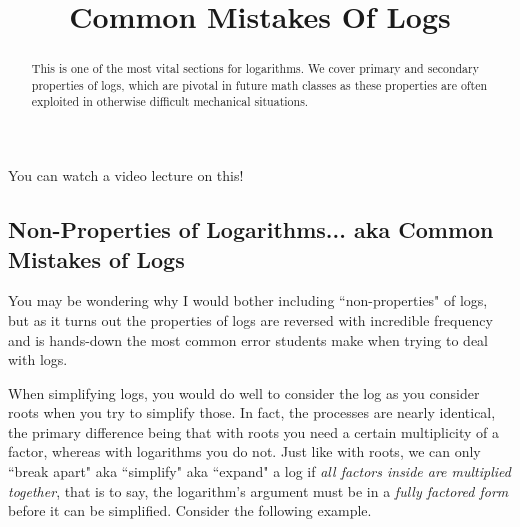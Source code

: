 \documentclass{ximera}
\title{Common Mistakes Of Logs}
\begin{document}
\begin{abstract}
This is one of the most vital sections for logarithms. We cover primary and secondary properties of logs, which are pivotal in future math classes as these properties are often exploited in otherwise difficult mechanical situations.
\end{abstract}
\maketitle

You can watch a video lecture on this!


\subsection*{Non-Properties of Logarithms... aka Common Mistakes of Logs}
    
    You may be wondering why I would bother including ``non-properties" of logs, but as it turns out the properties of logs are reversed with incredible frequency and is hands-down the most common error students make when trying to deal with logs.
    
    When simplifying logs, you would do well to consider the log as you consider roots when you try to simplify those. In fact, the processes are nearly identical, the primary difference being that with roots you need a certain multiplicity of a factor, whereas with logarithms you do not. Just like with roots, we can only ``break apart" aka ``simplify" aka ``expand" a log if \textit{all factors inside are multiplied together}, that is to say, the logarithm's argument must be in a \textit{fully factored form} before it can be simplified. Consider the following example.
    
\end{document}
